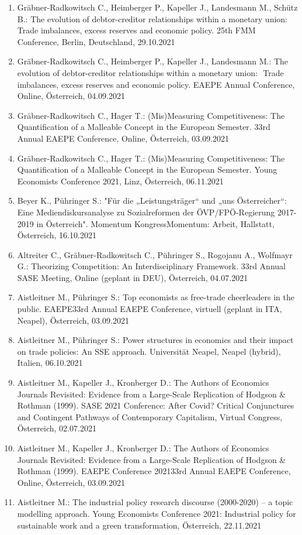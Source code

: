 \begin{enumerate}
	\item Gräbner-Radkowitsch C., Heimberger P., Kapeller J., Landesmann M., Schütz B.: The evolution of debtor-creditor relationships within a monetary union:  Trade imbalances, excess reserves and economic policy. 25th FMM Conference, Berlin, Deutschland, 29.10.2021
	\item Gräbner-Radkowitsch C., Heimberger P., Kapeller J., Landesmann M.: The evolution of debtor-creditor relationships within a monetary union:  Trade imbalances, excess reserves and economic policy. EAEPE Annual Conference, Online, Österreich, 04.09.2021
	\item Gräbner-Radkowitsch C., Hager T.: (Mis)Measuring Competitiveness: The Quantification of a Malleable Concept in the European Semester. 33rd Annual EAEPE Conference, Online, Österreich, 03.09.2021
	\item Gräbner-Radkowitsch C., Hager T.: (Mis)Measuring Competitiveness:  The Quantification of a Malleable Concept in the European Semester. Young Economists Conference 2021, Linz, Österreich, 06.11.2021
	\item Beyer K., Pühringer S.: "Für die „Leistungsträger“ und „uns Österreicher“: Eine Mediendiskursanalyse zu Sozialreformen der ÖVP/FPÖ-Regierung 2017-2019 in Österreich". Momentum KongressMomentum: Arbeit, Hallstatt, Österreich, 16.10.2021
	\item Altreiter C., Gräbner-Radkowitsch C., Pühringer S., Rogojanu A., Wolfmayr G.: Theorizing Competition: An Interdisciplinary Framework. 33rd Annual SASE Meeting, Online (geplant in DEU), Österreich, 04.07.2021
	\item Aistleitner M., Pühringer S.: Top economists as free-trade cheerleaders in the public. EAEPE33rd Annual EAEPE Conference, virtuell (geplant in ITA, Neapel), Österreich, 03.09.2021
	\item Aistleitner M., Pühringer S.: Power structures in economics and their impact on trade policies: An SSE approach. Universität Neapel, Neapel (hybrid), Italien, 06.10.2021
	\item Aistleitner M., Kapeller J., Kronberger D.: The Authors of Economics Journals Revisited: Evidence from a Large-Scale Replication of Hodgson & Rothman (1999). SASE 2021 Conference: After Covid? Critical Conjunctures and Contingent Pathways of Contemporary Capitalism, Virtual Congress, Österreich, 02.07.2021
	\item Aistleitner M., Kapeller J., Kronberger D.: The Authors of Economics Journals Revisited: Evidence from a Large-Scale Replication of Hodgson & Rothman (1999). EAEPE Conference 202133rd Annual EAEPE Conference, Online, Österreich, 03.09.2021
	\item Aistleitner M.: The industrial policy research discourse (2000-2020) – a topic modelling approach. Young Economists Conference 2021: Industrial policy for sustainable work and a green transformation, Österreich, 22.11.2021
\end{enumerate}
